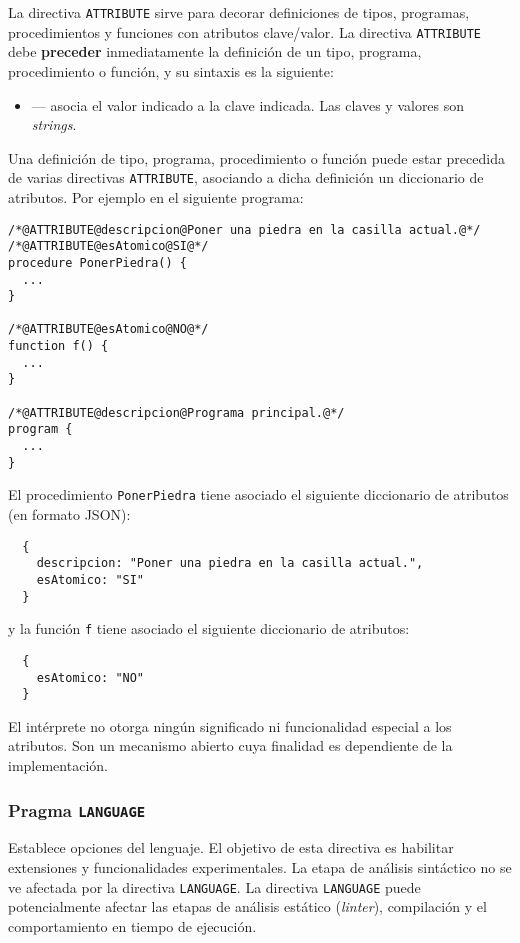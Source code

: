 \documentclass{article}
\begin{document}
La directiva \texttt{ATTRIBUTE} sirve para decorar definiciones de
tipos, programas, procedimientos y funciones con atributos clave/valor.
La directiva \texttt{ATTRIBUTE} debe {\bf preceder} inmediatamente la definici\'on
de un tipo, programa, procedimiento o funci\'on, y su sintaxis es la siguiente:
\begin{itemize}
\item {} --- asocia el valor indicado a la clave indicada.
      Las claves y valores son {\em strings}.
\end{itemize}
Una definici\'on de tipo, programa, procedimiento o funci\'on puede estar precedida
de varias directivas \texttt{ATTRIBUTE}, asociando a dicha definici\'on un diccionario
de atributos. Por ejemplo en el siguiente programa:
\begin{verbatim}
/*@ATTRIBUTE@descripcion@Poner una piedra en la casilla actual.@*/
/*@ATTRIBUTE@esAtomico@SI@*/
procedure PonerPiedra() {
  ...
}

/*@ATTRIBUTE@esAtomico@NO@*/
function f() {
  ...
}

/*@ATTRIBUTE@descripcion@Programa principal.@*/
program {
  ...
}
\end{verbatim}
El procedimiento \texttt{PonerPiedra} tiene asociado el siguiente diccionario de atributos
(en formato JSON):
\begin{verbatim}
  {
    descripcion: "Poner una piedra en la casilla actual.",
    esAtomico: "SI"
  }
\end{verbatim}
y la funci\'on \texttt{f} tiene asociado el siguiente diccionario de atributos:
\begin{verbatim}
  {
    esAtomico: "NO"
  }
\end{verbatim}
El int\'erprete no otorga ning\'un significado ni funcionalidad especial a los atributos.
Son un mecanismo abierto cuya finalidad es dependiente de la implementaci\'on.

\subsubsection{Pragma \texttt{LANGUAGE}}

Establece opciones del lenguaje.
El objetivo de esta directiva es habilitar extensiones y funcionalidades experimentales.
La etapa de an\'alisis sint\'actico no se ve afectada por la directiva \texttt{LANGUAGE}.
La directiva \texttt{LANGUAGE} puede potencialmente
afectar las etapas de an\'alisis est\'atico ({\em linter}),
compilaci\'on y el comportamiento en tiempo de ejecuci\'on.
\end{document}
